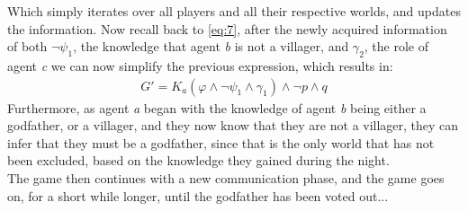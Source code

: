 Which simply iterates over all players and all their respective worlds, and
updates the information. Now recall back to \cref{eq:7}, after the newly
acquired information of both $\neg \psi_1$, the knowledge that agent \textit{b} 
is not a villager, and $\gamma_2$, the role of agent \textit{c} we can now 
simplify the previous expression, which results in:
\begin{align}
	G' = K_a(\varphi \land \neg \psi_1 \land \gamma_1) \land \neg p \land q
\end{align}
Furthermore, as agent \textit{a} began with the knowledge of agent \textit{b} 
being either a godfather, or a villager, and they now know that they are not a 
villager, they can infer that they must be a godfather, since that is the only 
world that has not been excluded, based on the knowledge they gained during the 
night. \\
The game then continues with a new communication phase, and the game goes on, 
for a short while longer, until the godfather has been voted out...
